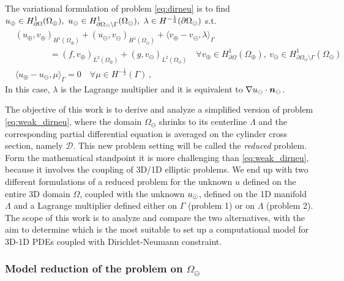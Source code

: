 \documentclass[r]{siamart171218}
\begin{document}
The variational formulation of problem \eqref{eq:dirneu}
is to find $u_{\oplus} \in H^1_{\partial\Omega}(\Omega_\oplus), \ u_{\ominus} \in H^1_{\partial\Omega_\ominus\setminus\Gamma}(\Omega_\ominus), \ \lambda \in H^{-\frac12}(\partial\Omega_\ominus)$ s.t.
\begin{subequations}\label{eq:weak_dirneu}
\begin{align}
&(u_\oplus,v_\oplus)_{H^1(\Omega_\oplus)} + (u_\ominus,v_\ominus)_{H^1(\Omega_\ominus)} 
+ \langle  v_\oplus - v_\ominus, \lambda \rangle_{\Gamma} 
\\
\nonumber
&\qquad\qquad = (f,v_\oplus)_{L^2(\Omega_\oplus)} + (g,v_\ominus)_{L^2(\Omega_\ominus)}
\quad \forall v_\oplus \in H^1_{\partial\Omega}(\Omega_\oplus), \ v_\ominus \in H^1_{\partial\Omega_\ominus\setminus\Gamma}(\Omega_\ominus)
\\
& \langle u_\oplus - u_\ominus, \mu \rangle_{\Gamma} = 0
\quad \forall  \mu \in H^{-\frac12}(\Gamma)\,,
\end{align}
\end{subequations}
In this case, $\lambda$ is the Lagrange multiplier and it is equivalent to $\nabla u_{\ominus} \cdot \boldsymbol n_\ominus$.

The objective of this work is to derive and analyze a simplified version of problem \eqref{eq:weak_dirneu}, where the domain $\Omega_\ominus$ shrinks to its centerline $\Lambda$ and the corresponding partial differential equation is averaged on the cylinder cross section, namely $\mathcal{D}$. This new problem setting will be called the \emph{reduced} problem. Form the mathematical standpoint it is more challenging than \eqref{eq:weak_dirneu}, because it involves the coupling of 3D/1D elliptic problems.
We end up with two different formulations of a reduced problem for the unknown $u$ defined on the entire 3D domain $\Omega$, 
coupled with the unknown $u_{\odot}$, defined on the 1D manifold $\Lambda$ and a Lagrange multiplier defined either on $\Gamma$ (problem 1) or on $\Lambda$ (problem 2). 
The scope of this work is to analyze and compare the two alternatives,
with the aim to determine which is the most suitable to set up a computational model for 3D-1D PDEs coupled with Dirichlet-Neumann constraint.


\subsubsection*{Model reduction of the problem on $\Omega_{\ominus}$}
\end{document}
